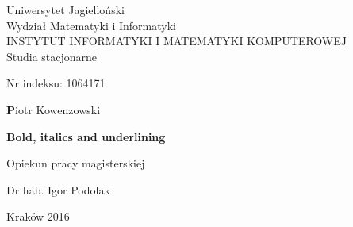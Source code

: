 \begin{titlepage}
\begin{center}
Uniwersytet Jagielloński \\
Wydział Matematyki i Informatyki \\
{\large INSTYTUT INFORMATYKI I MATEMATYKI KOMPUTEROWEJ} \\
Studia stacjonarne \\
\end{center}

\vspace*{\fill}

Nr indeksu: 1064171

\vspace*{\fill}

\begin{center}
{\Large\textbf Piotr Kowenzowski}

\vspace*{0.5cm}
{\Huge\textbf {Bold, italics and underlining}}

\end{center}



\vspace*{\fill}

\begin{flushright}
Opiekun pracy magisterskiej

Dr hab. Igor Podolak
\end{flushright}

\vspace*{\fill}

\begin{center}
	{\huge Kraków 2016}
\end{center}
\end{titlepage}
